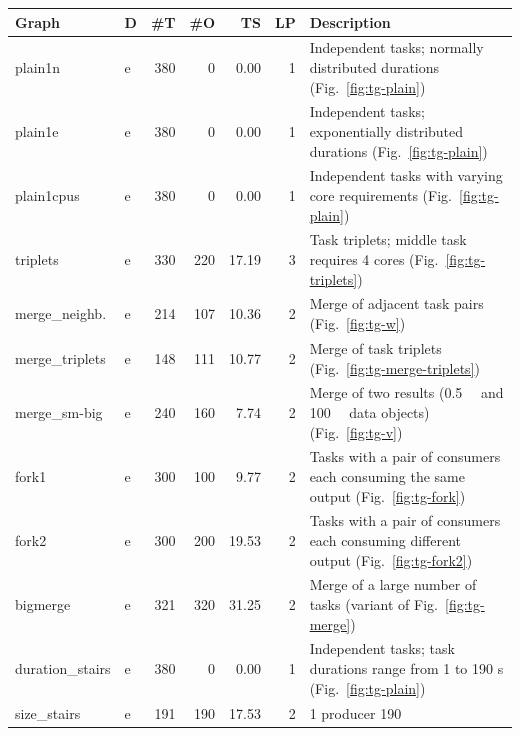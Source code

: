 \begin{table}[h]
	\centering
	\begin{tabular}{l|lrrrr|T}
		\toprule
		Graph            & D & \#T & \#O   & TS     & LP  & \normalsize{Description}               \\
		\midrule
		plain1n          & e & 380 & 0     & 0.00   & 1   & Independent tasks;
		normally distributed durations (Fig.~\ref{fig:tg-plain})                                   \\
		plain1e          & e & 380 & 0     & 0.00   & 1   & Independent tasks;
		exponentially distributed durations (Fig.~\ref{fig:tg-plain})                              \\
		plain1cpus       & e & 380 & 0     & 0.00   & 1   & Independent tasks with
		varying core requirements (Fig.~\ref{fig:tg-plain})                                        \\
		triplets         & e & 330 & 220   & 17.19  & 3   & Task triplets; middle
		task requires 4 cores (Fig.~\ref{fig:tg-triplets})                                         \\
		merge\_neighb.   & e & 214 & 107   & 10.36  & 2   & Merge of adjacent
		task pairs (Fig.~\ref{fig:tg-w})                                                           \\
		merge\_triplets  & e & 148 & 111   & 10.77  & 2   & Merge of task
		triplets (Fig.~\ref{fig:tg-merge-triplets})                                                \\
		merge\_sm-big    & e & 240 & 160   & 7.74   & 2   & Merge of two
		results (\SI{0.5}{\mebi\byte} and \SI{100}{\mebi\byte} data objects) (Fig.~\ref{fig:tg-v}) \\
		fork1            & e & 300 & 100   & 9.77   & 2   & Tasks with a pair of
		consumers each consuming the same output (Fig.~\ref{fig:tg-fork})                          \\
		fork2            & e & 300 & 200   & 19.53  & 2   & Tasks with a pair of
		consumers each consuming different output (Fig.~\ref{fig:tg-fork2})                        \\
		bigmerge         & e & 321 & 320   & 31.25  & 2   & Merge of a large
		number of tasks (variant of Fig.~\ref{fig:tg-merge})                                       \\
		duration\_stairs & e & 380 & 0     & 0.00   & 1   & Independent
		tasks; task durations range from 1 to 190 s (Fig.~\ref{fig:tg-plain})                      \\
		size\_stairs     & e & 191 & 190   & 17.53  & 2   & 1 producer 190

\end{tabular}
\end{table}
